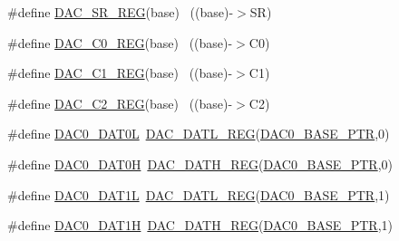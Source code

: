 \begin{DoxyCompactItemize}
\item 
\#define \hyperlink{group___d_a_c___register___accessor___macros_ga6f61e2c24c3ca2e6207c3a46a95da33a}{D\+A\+C\+\_\+\+S\+R\+\_\+\+R\+EG}(base)                                              ~((base)-\/$>$SR)
\item 
\#define \hyperlink{group___d_a_c___register___accessor___macros_ga2ad6906035a9d1a45b0493f8010b630b}{D\+A\+C\+\_\+\+C0\+\_\+\+R\+EG}(base)                                              ~((base)-\/$>$C0)
\item 
\#define \hyperlink{group___d_a_c___register___accessor___macros_ga4f28424aead9b953486830b6f3c4b3e6}{D\+A\+C\+\_\+\+C1\+\_\+\+R\+EG}(base)                                              ~((base)-\/$>$C1)
\item 
\#define \hyperlink{group___d_a_c___register___accessor___macros_ga5627f7a03cdcede26b3f5a60bc7a3871}{D\+A\+C\+\_\+\+C2\+\_\+\+R\+EG}(base)                                              ~((base)-\/$>$C2)
\item 
\#define \hyperlink{group___d_a_c___register___accessor___macros_ga42102f01d7c10ffe6e888e69befd52cd}{D\+A\+C0\+\_\+\+D\+A\+T0L}~\hyperlink{group___d_a_c___register___accessor___macros_gabf321758d2caebaf297aed5907b1bb5d}{D\+A\+C\+\_\+\+D\+A\+T\+L\+\_\+\+R\+EG}(\hyperlink{group___d_a_c___peripheral_gabe3b30df06ec04e5c899efd6e49f1800}{D\+A\+C0\+\_\+\+B\+A\+S\+E\+\_\+\+P\+TR},0)
\item 
\#define \hyperlink{group___d_a_c___register___accessor___macros_ga3ad29b1caa28a60ed8fbb86aa56b76e6}{D\+A\+C0\+\_\+\+D\+A\+T0H}~\hyperlink{group___d_a_c___register___accessor___macros_ga2993d3474a391b72469826f58317edc9}{D\+A\+C\+\_\+\+D\+A\+T\+H\+\_\+\+R\+EG}(\hyperlink{group___d_a_c___peripheral_gabe3b30df06ec04e5c899efd6e49f1800}{D\+A\+C0\+\_\+\+B\+A\+S\+E\+\_\+\+P\+TR},0)
\item 
\#define \hyperlink{group___d_a_c___register___accessor___macros_gabf88b7108b7dbe4a53e9f8af739e1b94}{D\+A\+C0\+\_\+\+D\+A\+T1L}~\hyperlink{group___d_a_c___register___accessor___macros_gabf321758d2caebaf297aed5907b1bb5d}{D\+A\+C\+\_\+\+D\+A\+T\+L\+\_\+\+R\+EG}(\hyperlink{group___d_a_c___peripheral_gabe3b30df06ec04e5c899efd6e49f1800}{D\+A\+C0\+\_\+\+B\+A\+S\+E\+\_\+\+P\+TR},1)
\item 
\#define \hyperlink{group___d_a_c___register___accessor___macros_ga81fd0c2515b08c9925d83d7102815219}{D\+A\+C0\+\_\+\+D\+A\+T1H}~\hyperlink{group___d_a_c___register___accessor___macros_ga2993d3474a391b72469826f58317edc9}{D\+A\+C\+\_\+\+D\+A\+T\+H\+\_\+\+R\+EG}(\hyperlink{group___d_a_c___peripheral_gabe3b30df06ec04e5c899efd6e49f1800}{D\+A\+C0\+\_\+\+B\+A\+S\+E\+\_\+\+P\+TR},1)

\end{DoxyCompactItemize}
